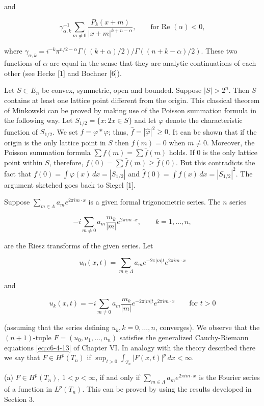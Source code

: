 and

\[
\gamma_{\alpha,k}^{-1}\sum_{m\neq0}\frac{P_{k}(x+m)}{|x+m|^{k+n-\alpha}},\qquad\text{for Re }(\alpha)<0,
\]

where $\gamma_{\alpha,k} = i^{-k}\pi^{n/2-\alpha}\Gamma((k + \alpha)/2)/\Gamma((n + k - \alpha)/2)$. These two functions of $\alpha$ are equal in the sense that they are analytic continuations of each other (see Hecke [1] and Bochner [6]).

 Let $S \subset E_n$ be convex, symmetric, open and bounded. Suppose $|S| > 2^n$. Then $S$ contains at least one lattice point different from the origin. This classical theorem of Minkowski can be proved by making use of the Poisson summation formula in the following way. Let $S_{1/2} = \{x: 2x \in S\}$ and let $\varphi$ denote the characteristic function of $S_{1/2}$. We set $f = \varphi * \varphi$; thus, $\hat{f} = |\hat{\varphi}|^2 \geq 0$. It can be shown that if the origin is the only lattice point in $S$ then $f(m) = 0$ when $m \neq 0$. Moreover, the Poisson summation formula $\sum f(m) = \sum \hat{f}(m)$ holds. If 0 is the only lattice point within $S$, therefore, $f(0) = \sum \hat{f}(m) \geq \hat{f}(0)$. But this contradicts the fact that $f(0) = \int \varphi(x) \, dx = |S_{1/2}|$ and $\hat{f}(0) = \int f(x) \, dx = |S_{1/2}|^2$. The argument sketched goes back to Siegel [1].

 Suppose $\sum_{m\in\Lambda} a_m e^{2\pi im \cdot x}$ is a given formal trigonometric series. The $n$ series

\[
-i\sum_{m\neq0}a_{m}\frac{m_{k}}{|m|}e^{2\pi i m\cdot x},\qquad k=1,\ldots,n,
\]

are the Riesz transforms of the given series. Let

\[
u_{0}(x,t)=\sum_{m\in\Lambda}a_{m}e^{-2\pi\vert m\vert t}e^{2\pi i m\cdot x}
\]

and

\[
u_{k}(x,t)=-i\sum_{m\neq0}a_{m}\frac{m_{k}}{|m|}e^{-2\pi|m|t}e^{2\pi i m\cdot x}\qquad\text{for }t>0
\]

(assuming that the series defining $u_k, k = 0, \ldots, n$, converges). We observe that the $(n + 1)$-tuple $F = (u_0, u_1, \ldots, u_n)$ satisfies the generalized Cauchy-Riemann equations \eqref{eq:c6-4-13} of Chapter VI. In analogy with the theory described there we say that $F \in H^p(T_n)$ if $\sup_{t > 0} \int_{T_n} |F(x, t)|^p \, dx < \infty$.

(a) $F \in H^p(T_n)$, $1 < p < \infty$, if and only if $\sum_{m \in \Lambda} a_m e^{2\pi i m \cdot x}$ is the Fourier series of a function in $L^p(T_n)$. This can be proved by using the results developed in Section 3.

